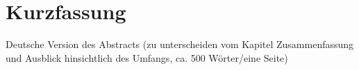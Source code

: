 \chapter*{Kurzfassung}
\label{ch:GermanAbstract}
Deutsche Version des Abstracts
(zu unterscheiden vom Kapitel Zusammenfassung und Ausblick
hinsichtlich des Umfangs, ca. 500 Wörter/eine Seite)
